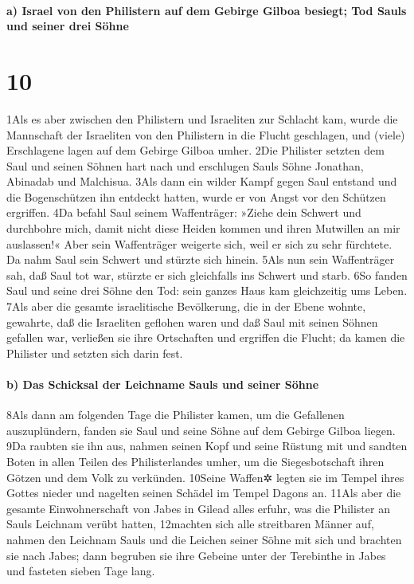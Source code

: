 \hypertarget{a-israel-von-den-philistern-auf-dem-gebirge-gilboa-besiegt-tod-sauls-und-seiner-drei-suxf6hne}{%
\paragraph{a) Israel von den Philistern auf dem Gebirge Gilboa besiegt;
Tod Sauls und seiner drei
Söhne}\label{a-israel-von-den-philistern-auf-dem-gebirge-gilboa-besiegt-tod-sauls-und-seiner-drei-suxf6hne}}

\hypertarget{section-9}{%
\section{10}\label{section-9}}

1Als es aber zwischen den Philistern und Israeliten zur Schlacht kam,
wurde die Mannschaft der Israeliten von den Philistern in die Flucht
geschlagen, und (viele) Erschlagene lagen auf dem Gebirge Gilboa umher.
2Die Philister setzten dem Saul und seinen Söhnen hart nach und
erschlugen Sauls Söhne Jonathan, Abinadab und Malchisua. 3Als dann ein
wilder Kampf gegen Saul entstand und die Bogenschützen ihn entdeckt
hatten, wurde er von Angst vor den Schützen ergriffen. 4Da befahl Saul
seinem Waffenträger: »Ziehe dein Schwert und durchbohre mich, damit
nicht diese Heiden kommen und ihren Mutwillen an mir auslassen!« Aber
sein Waffenträger weigerte sich, weil er sich zu sehr fürchtete. Da nahm
Saul sein Schwert und stürzte sich hinein. 5Als nun sein Waffenträger
sah, daß Saul tot war, stürzte er sich gleichfalls ins Schwert und
starb. 6So fanden Saul und seine drei Söhne den Tod: sein ganzes Haus
kam gleichzeitig ums Leben. 7Als aber die gesamte israelitische
Bevölkerung, die in der Ebene wohnte, gewahrte, daß die Israeliten
geflohen waren und daß Saul mit seinen Söhnen gefallen war, verließen
sie ihre Ortschaften und ergriffen die Flucht; da kamen die Philister
und setzten sich darin fest.

\hypertarget{b-das-schicksal-der-leichname-sauls-und-seiner-suxf6hne}{%
\paragraph{b) Das Schicksal der Leichname Sauls und seiner
Söhne}\label{b-das-schicksal-der-leichname-sauls-und-seiner-suxf6hne}}

8Als dann am folgenden Tage die Philister kamen, um die Gefallenen
auszuplündern, fanden sie Saul und seine Söhne auf dem Gebirge Gilboa
liegen. 9Da raubten sie ihn aus, nahmen seinen Kopf und seine Rüstung
mit und sandten Boten in allen Teilen des Philisterlandes umher, um die
Siegesbotschaft ihren Götzen und dem Volk zu verkünden. 10Seine Waffen✲
legten sie im Tempel ihres Gottes nieder und nagelten seinen Schädel im
Tempel Dagons an. 11Als aber die gesamte Einwohnerschaft von Jabes in
Gilead alles erfuhr, was die Philister an Sauls Leichnam verübt hatten,
12machten sich alle streitbaren Männer auf, nahmen den Leichnam Sauls
und die Leichen seiner Söhne mit sich und brachten sie nach Jabes; dann
begruben sie ihre Gebeine unter der Terebinthe in Jabes und fasteten
sieben Tage lang.

